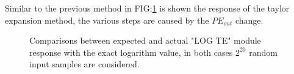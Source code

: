 \documentclass[12pt]{article}
\begin{document}
Similar to the previous method in FIG:\ref{fig:TE_LOG} is shown the response of the taylor expansion method, the various steps are caused by the $PE_{out}$ change.
\begin{figure}[h]
    \begin{minipage}[c]{0.5\linewidth}
        \vspace{0pt}
        \centering
    \end{minipage}%
    \hfill%
    \begin{minipage}[c]{0.5\linewidth}
        \vspace{0pt}
        \centering
    \end{minipage}%
    \caption{Comparisons between expected and actual "LOG TE" module response with the exact logarithm value, in both cases $2^{20}$ random input samples are considered.}
    \label{fig:TE_LOG}
\end{figure}
\end{document}
